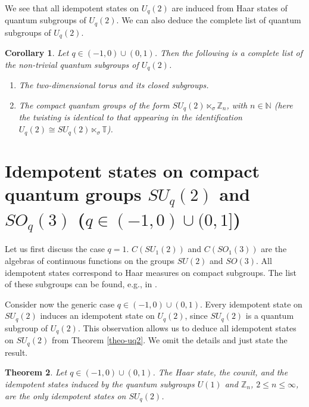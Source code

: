 \documentclass[12pt]{amsart}
\newtheorem{theorem}{Theorem}[section]
\newtheorem{corollary}[theorem]{Corollary}
\theoremstyle{definition}
\theoremstyle{remark}
\numberwithin{equation}{section}
\begin{document}
We see that all idempotent states on $U_q(2)$ are induced from Haar states of quantum subgroups of $U_q(2)$. We can also deduce the complete list of quantum subgroups of $U_q(2)$.

\begin{corollary}\label{uq2-subgroups}
Let $q\in(-1,0)\cup(0,1)$. Then the following is a complete list of the non-trivial quantum subgroups of $U_q(2)$.
\begin{enumerate}
\item
The two-dimensional torus and its closed subgroups.
\item
The compact quantum groups of the form $SU_q(2)\ltimes_\sigma \mathbb{Z}_n$, with $n\in\mathbb{N}$
(here the twisting is identical to that appearing in the identification $U_q(2) \cong
SU_q(2)\ltimes_\sigma \mathbb{T}$).
\end{enumerate}
\end{corollary}

\section{Idempotent states on compact quantum groups $SU_q(2)$ and $SO_q(3)$ ($q \in (-1,0)\cup(0,1]$)}

Let us first discuss the case $q=1$. $C(SU_1(2))$ and $C(SO_1(3))$ are the
algebras of continuous functions on the groups $SU(2)$ and $SO(3)$. All
idempotent states correspond  to Haar measures on compact subgroups. The list of
these subgroups can be found, e.g., in \cite{podles95}.

Consider now the generic case $q\in(-1,0)\cup(0,1)$.
Every idempotent state on $SU_q(2)$ induces an idempotent state on $U_q(2)$,
since $SU_q(2)$ is a quantum subgroup of $U_q(2)$. This observation allows us to deduce all idempotent states on $SU_q(2)$ from Theorem \ref{theo-uq2}. We omit
the details and just state the result.

\begin{theorem}\label{theo-suq2}
Let $q\in(-1,0)\cup(0,1)$. The Haar state, the counit, and the idempotent states induced by the quantum
subgroups $U(1)$ and $\mathbb{Z}_n$, $2\le n\le \infty$, are the only
idempotent states on $SU_q(2)$.
\end{theorem}
\end{document}
